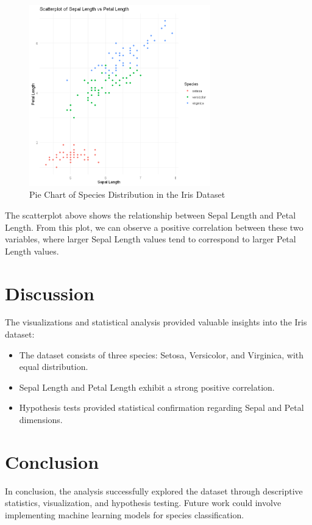 \documentclass[a4paper,12pt]{article}
\begin{document}
    \begin{figure}[h]
        \includegraphics[width=0.7\textwidth]{Images/05.png}
        \caption{Pie Chart of Species Distribution in the Iris Dataset}
        \label{fig:pie_chart}
    \end{figure}
    The scatterplot above shows the relationship between Sepal Length and Petal Length. From this plot, we can observe a positive correlation between these two variables, where larger Sepal Length values tend to correspond to larger Petal Length values.

    \newpage

\section{Discussion}
The visualizations and statistical analysis provided valuable insights into the Iris dataset:
\begin{itemize}
    \item The dataset consists of three species: Setosa, Versicolor, and Virginica, with equal distribution.
    \item Sepal Length and Petal Length exhibit a strong positive correlation.
    \item Hypothesis tests provided statistical confirmation regarding Sepal and Petal dimensions.
\end{itemize}

\section{Conclusion}
In conclusion, the analysis successfully explored the dataset through descriptive statistics, visualization, and hypothesis testing. Future work could involve implementing machine learning models for species classification.
\end{document}
